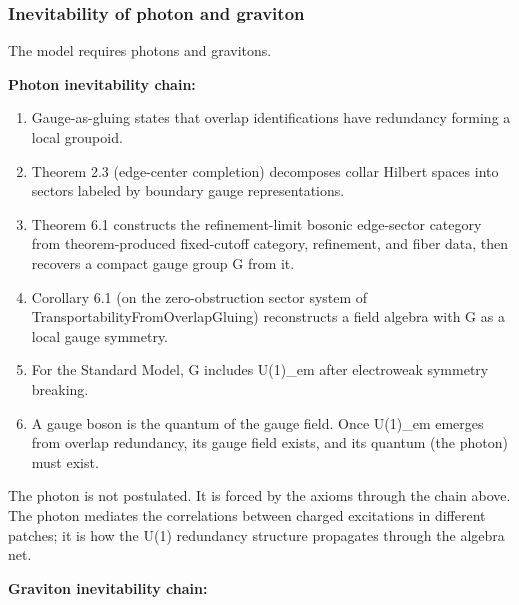 \subsubsection{Inevitability of photon and graviton}\label{611-inevitability-of-photon-and-graviton}

The model requires photons and gravitons.

\textbf{Photon inevitability chain:}

\begin{enumerate}
\def\labelenumi{\arabic{enumi}.}
\tightlist
\item
  Gauge-as-gluing states that overlap identifications have redundancy forming a local groupoid.
\item
  Theorem 2.3 (edge-center completion) decomposes collar Hilbert spaces into sectors labeled by boundary gauge representations.
\item
  Theorem 6.1 constructs the refinement-limit bosonic edge-sector category from theorem-produced fixed-cutoff category, refinement, and fiber data, then recovers a compact gauge group G from it.
\item
  Corollary 6.1 (on the zero-obstruction sector system of TransportabilityFromOverlapGluing) reconstructs a field algebra with G as a local gauge symmetry.
\item
  For the Standard Model, G includes U(1)\_em after electroweak symmetry breaking.
\item
  A gauge boson is the quantum of the gauge field. Once U(1)\_em emerges from overlap redundancy, its gauge field exists, and its quantum (the photon) must exist.
\end{enumerate}

The photon is not postulated. It is forced by the axioms through the chain above. The photon mediates the correlations between charged excitations in different patches; it is how the U(1) redundancy structure propagates through the algebra net.

\textbf{Graviton inevitability chain:}

